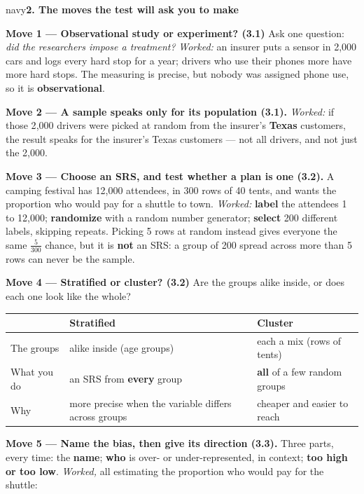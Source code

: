 \documentclass[12pt]{article}
\newcommand{\sghead}[2][10]{%
  \vspace{0.13in}
  \boxguard[#1]
  \begin{headlinebox}{navy}\color{white}\bfseries\small #2\end{headlinebox}
  \vspace{0.09in}}
\begin{document}
\normalsize

\sghead{2. The moves the test will ask you to make}

\small
\textbf{Move 1 --- Observational study or experiment? (3.1)} Ask one question: \emph{did the
researchers impose a treatment?} \emph{Worked:} an insurer puts a sensor in 2{,}000 cars and
logs every hard stop for a year; drivers who use their phones more have more hard stops. The
measuring is precise, but nobody was assigned phone use, so it is \textbf{observational}.

\vspace{3pt}
\textbf{Move 2 --- A sample speaks only for its population (3.1).} \emph{Worked:} if those 2{,}000
drivers were picked at random from the insurer's \textbf{Texas} customers, the result speaks for
the insurer's Texas customers --- not all drivers, and not just the 2{,}000.

\vspace{3pt}
\textbf{Move 3 --- Choose an SRS, and test whether a plan is one (3.2).} A camping festival has
12{,}000 attendees, in 300 rows of 40 tents, and wants the proportion who would pay for a shuttle
to town. \emph{Worked:} \textbf{label} the attendees 1 to 12{,}000; \textbf{randomize} with a
random number generator; \textbf{select} 200 different labels, skipping repeats. Picking 5 rows at
random instead gives everyone the same $\tfrac{5}{300}$ chance, but it is \textbf{not} an SRS: a
group of 200 spread across more than 5 rows can never be the sample.

\vspace{3pt}
\boxguard[9]
\textbf{Move 4 --- Stratified or cluster? (3.2)} Are the groups alike inside, or does each one
look like the whole?

\vspace{2pt}
\noindent\begin{tabularx}{\linewidth}{@{} l X X @{}}
\rowcolor{sky}
 & \textbf{Stratified} & \textbf{Cluster} \\
\midrule
The groups & alike inside (age groups) & each a mix (rows of tents) \\
What you do & an SRS from \textbf{every} group & \textbf{all} of a few random groups \\
Why & more precise when the variable differs across groups & cheaper and easier to reach \\
\end{tabularx}

\vspace{5pt}
\boxguard[6]
\textbf{Move 5 --- Name the bias, then give its direction (3.3).} Three parts, every time: the
\textbf{name}; \textbf{who} is over- or under-represented, in context; \textbf{too high or too
low}. \emph{Worked,} all estimating the proportion who would pay for the shuttle:
\end{document}
